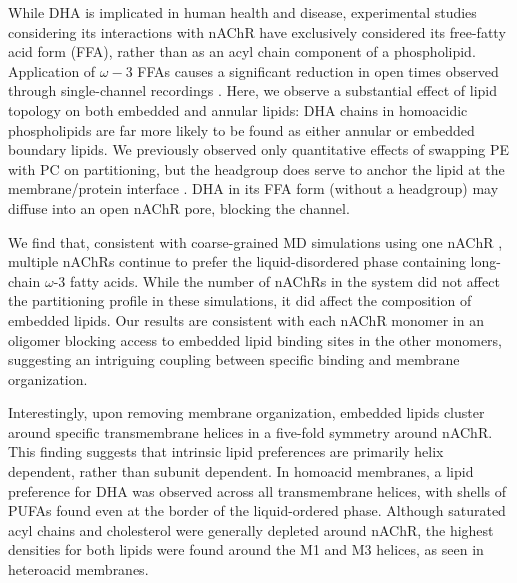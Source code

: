 While DHA is implicated in human health and disease, \citep{12439486320170901} experimental studies considering its interactions with nAChR have exclusively considered its free-fatty acid form (FFA), \citep{Antollini2016} %
rather than as an acyl chain component of a phospholipid. Application of $\omega-3$ FFAs causes a significant reduction in open times observed through single-channel recordings  \citep{Bouzat1993}. Here, we observe a substantial effect of lipid topology on both embedded and annular lipids: DHA chains in homoacidic phospholipids are far more likely to be found as either annular or embedded boundary lipids.  We previously observed only quantitative effects of swapping PE with PC on partitioning, but the headgroup does serve to anchor the lipid at the membrane/protein interface  \citep{Sharp2019}.  DHA in its FFA form (without a headgroup) may diffuse into an open nAChR pore, blocking the channel. %

We find that, consistent with coarse-grained MD simulations using one nAChR \citep{Sharp2019}, multiple nAChRs continue to prefer the liquid-disordered phase containing long-chain $\omega$-3 fatty acids. While the number of nAChRs in the system did not affect the partitioning profile in these simulations, it did affect the composition of embedded lipids. Our results are consistent with each nAChR monomer in an oligomer blocking access to embedded lipid binding sites in the other monomers, suggesting an intriguing coupling between specific binding and membrane organization.  

Interestingly, upon removing membrane organization, embedded lipids cluster around specific transmembrane helices in a five-fold symmetry around nAChR. This finding suggests that intrinsic lipid preferences are primarily helix dependent, rather than subunit dependent. In homoacid membranes, a lipid preference for DHA was observed across all transmembrane helices, with shells of PUFAs found even at the border of the liquid-ordered phase. Although saturated acyl chains and cholesterol were generally depleted around nAChR, the highest densities for both lipids were found around the M1 and M3 helices, as seen in heteroacid membranes.

